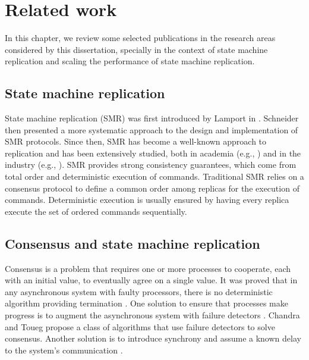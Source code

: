 \chapter[Related work]{Related work}
\label{sec:rw}

In this chapter, we review some selected publications in the research areas considered
by this dissertation, specially in the context of state machine replication and scaling
the performance of state machine replication.

\section{State machine replication}

State machine replication (SMR) was first introduced by Lamport in \cite{Lam78}. Schneider \cite{Sch90} then presented a more systematic
approach to the design and implementation of SMR protocols. Since then, SMR has
become a well-known approach to replication and has been extensively studied,
both in academia (e.g., \cite{Kapritsos:2012um, Kotla:2004ep, santos2013htsmr,
Mencius}) and in the industry (e.g., \cite{corbett2013spanner}). SMR provides strong consistency guarantees, which
come from total order and deterministic execution of commands. Traditional SMR
relies on a consensus protocol to define a common order among replicas for the execution of 
commands. Deterministic execution is usually ensured by having every replica
execute the set of ordered commands sequentially.


\section{Consensus and state machine replication}

Consensus \cite{Lam78, paprzycki:2001distributed} is a problem that requires one
or more processes to cooperate, each with an initial value, to eventually agree on
a single value. It was proved that in any asynchronous system with faulty
processors, there is no deterministic algorithm providing termination
\cite{FLP85}. One solution to ensure that processes make progress is to augment the asynchronous system with failure detectors \cite{aguilera:2000failure}.
Chandra and Toueg \cite{CT96} propose a class of algorithms that use failure
detectors to solve consensus. Another solution is to introduce synchrony and
assume a known delay to the system's communication \cite{aspnes2003randomized}.

